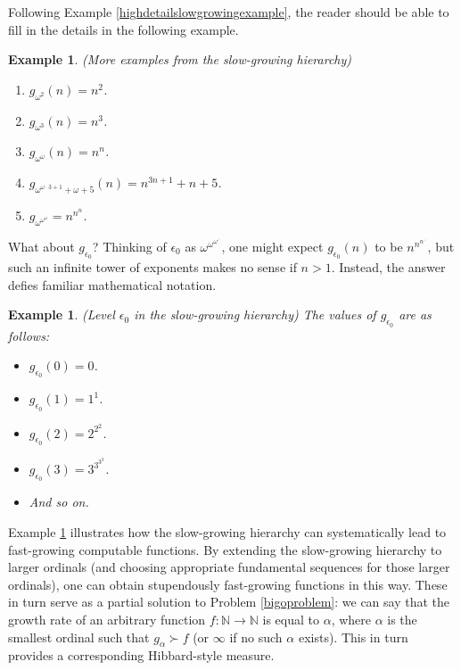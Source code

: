 \documentclass{article}
\newtheorem{example}[theorem]{Example}
\begin{document}
Following Example \ref{highdetailslowgrowingexample}, the reader should be able
to fill in the details in the following example.

\begin{example}
    (More examples from the slow-growing hierarchy)
    \begin{enumerate}
        \item
        $g_{\omega^2}(n)=n^2$.
        \item
        $g_{\omega^3}(n)=n^3$.
        \item
        $g_{\omega^\omega}(n)=n^n$.
        \item
        $g_{\omega^{\omega\cdot 3+1}+\omega+5}(n)=n^{3n+1}+n+5$.
        \item
        $g_{\omega^{\omega^{\omega}}}=n^{n^n}$.
    \end{enumerate}
\end{example}

What about $g_{\epsilon_0}$? Thinking of $\epsilon_0$ as
$\omega^{\omega^{\omega^{\iddots}}}$,
one might expect $g_{\epsilon_0}(n)$ to be $n^{n^{n^{\iddots}}}$, but such an infinite tower
of exponents makes no sense if $n>1$. Instead, the answer defies familiar mathematical
notation.

\begin{example}
\label{epsilon0example}
(Level $\epsilon_0$ in the slow-growing hierarchy)
The values of $g_{\epsilon_0}$ are as follows:
\begin{itemize}
    \item
    $g_{\epsilon_0}(0)=0$.
    \item
    $g_{\epsilon_0}(1)=1^1$.
    \item
    $g_{\epsilon_0}(2)=2^{2^2}$.
    \item
    $g_{\epsilon_0}(3)=3^{3^{3^3}}$.
    \item
    And so on.
\end{itemize}
\end{example}

Example \ref{epsilon0example} illustrates how the slow-growing hierarchy can systematically
lead to fast-growing computable functions. By extending the slow-growing hierarchy to
larger ordinals (and choosing appropriate fundamental sequences for those larger ordinals),
one can obtain stupendously fast-growing functions in this way. These in turn serve as
a partial solution to Problem \ref{bigoproblem}: we can say that the growth rate of
an arbitrary function $f:\mathbb N\to\mathbb N$
is equal to $\alpha$, where $\alpha$ is the smallest ordinal such
that $g_\alpha\succ f$ (or $\infty$ if no such $\alpha$ exists).
This in turn provides a corresponding Hibbard-style measure.
\end{document}
